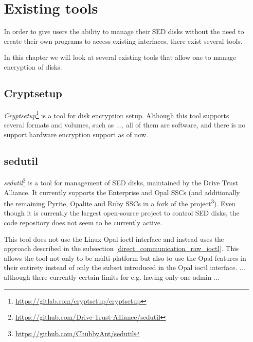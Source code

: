 
\chapter{Existing tools}

In order to give users the ability to manage their SED disks without the need to create their own programs to access existing interfaces, there exist several tools. 

In this chapter we will look at several existing tools that allow one to manage encryption of disks.

\section{Cryptsetup}

\emph{Cryptsetup}\footnote{\url{https://gitlab.com/cryptsetup/cryptsetup}} is a tool for disk encryption setup. Although this tool supports several formats and volumes, such as ..., all of them are software, and there is no support hardware encryption support as of now.

\section{sedutil}

\emph{sedutil}\footnote{\url{https://github.com/Drive-Trust-Alliance/sedutil}} is a tool for management of SED disks, maintained by the Drive Trust Alliance.
It currently supports the Enterprise and Opal SSCs (and additionally the remaining Pyrite, Opalite and Ruby SSCs in a fork of the project\footnote{\url{https://github.com/ChubbyAnt/sedutil}}).
Even though it is currently the largest open-source project to control SED disks, the code repository does not seem to be currently active.

This tool does not use the Linux Opal ioctl interface and instead uses the approach described in the subsection \ref{direct_communication_raw_ioctl}. This allows the tool not only to be multi-platform but also to use the Opal features in their entirety instead of only the subset introduced in the Opal ioctl interface.
... although there currently certain limits for e.g. having only one admin ...

